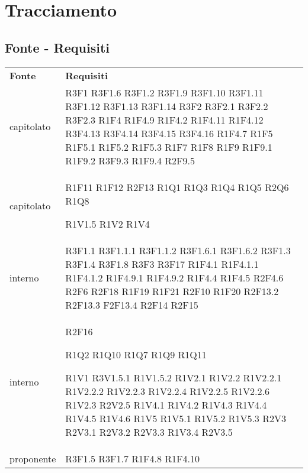 \section{Tracciamento}
	\subsection{Fonte - Requisiti}
	\begin{longtable} {
		>{\centering}p{28mm}  
		>{}p{20mm}
		}
	\rowcolor{gray!50}
		\textbf{Fonte} & \textbf{Requisiti}	\TBstrut \\

		capitolato & 
		R3F1
		R3F1.6
		R3F1.2
		R3F1.9
		R3F1.10
		R3F1.11
		R3F1.12
		R3F1.13
		R3F1.14
		R3F2
		R3F2.1
		R3F2.2
		R3F2.3
		R1F4
		R1F4.9
		R1F4.2
		R1F4.11
		R1F4.12
		R3F4.13
		R3F4.14
		R3F4.15
		R3F4.16
		R1F4.7
		R1F5 
		R1F5.1
		R1F5.2
		R1F5.3
		R1F7
		R1F8
		R1F9
		R1F9.1
		R1F9.2
		R3F9.3
		R1F9.4
		R2F9.5  \TBstrut \\ [2mm]

		capitolato &
		R1F11
		R1F12
		R2F13
		R1Q1 
		R1Q3 
		R1Q4 
		R1Q5 
		R2Q6
		R1Q8
		 
		R1V1.5
		R1V2
		R1V4 \TBstrut \\ [2mm]
				
		interno & 
		R3F1.1
		R3F1.1.1
		R3F1.1.2
		R3F1.6.1
		R3F1.6.2
		R3F1.3
		R3F1.4
		R3F1.8
		R3F3
		R3F17
		R1F4.1
		R1F4.1.1
		R1F4.1.2
		R1F4.9.1
		R1F4.9.2
		R1F4.4
		R1F4.5
		R2F4.6
		R2F6
		R2F18
		R1F19
		R1F21  
		R2F10
		R1F20
		R2F13.2
		R2F13.3
		F2F13.4
		R2F14
		R2F15 \TBstrut \\ [2mm]

		interno &
		R2F16
		
		R1Q2 
		R1Q10
		R1Q7
		R1Q9
		R1Q11

		R1V1
		R3V1.5.1
		R1V1.5.2 
		R1V2.1 
		R1V2.2 
		R1V2.2.1 
		R1V2.2.2 
		R1V2.2.3 
		R1V2.2.4 
		R1V2.2.5 
		R1V2.2.6
		R1V2.3 
		R2V2.5 
		R1V4.1
		R1V4.2
		R1V4.3
		R1V4.4
		R1V4.5
		R1V4.6
		R1V5
		R1V5.1
		R1V5.2
		R1V5.3
		R2V3 
		R2V3.1 
		R2V3.2 
		R2V3.3
		R1V3.4
		R2V3.5 \TBstrut \\ [2mm]

		proponente &
		R3F1.5
		R3F1.7
		R1F4.8
		R1F4.10 \TBstrut \\ [2mm]
				

\end{longtable}
